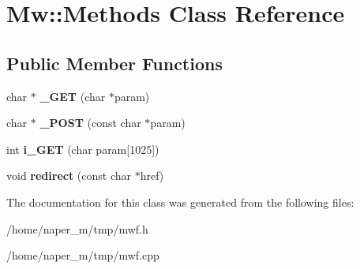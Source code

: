 \hypertarget{class_mw_1_1_methods}{\section{Mw\-:\-:Methods Class Reference}
\label{class_mw_1_1_methods}
}
\subsection*{Public Member Functions}
\begin{DoxyCompactItemize}
\item 
\hypertarget{class_mw_1_1_methods_ada65ad3c59fe222e7fce142459c24925}{char $\ast$ {\bfseries \-\_\-\-G\-E\-T} (char $\ast$param)}\label{class_mw_1_1_methods_ada65ad3c59fe222e7fce142459c24925}

\item 
\hypertarget{class_mw_1_1_methods_a9cb27954de74d75f45079f1bcd3cfc69}{char $\ast$ {\bfseries \-\_\-\-P\-O\-S\-T} (const char $\ast$param)}\label{class_mw_1_1_methods_a9cb27954de74d75f45079f1bcd3cfc69}

\item 
\hypertarget{class_mw_1_1_methods_aa3435e9b58d33433e47efe700c7fa77c}{int {\bfseries i\-\_\-\-G\-E\-T} (char param\mbox{[}1025\mbox{]})}\label{class_mw_1_1_methods_aa3435e9b58d33433e47efe700c7fa77c}

\item 
\hypertarget{class_mw_1_1_methods_a7628ff0b82ee7d7ac47a8877de7344a4}{void {\bfseries redirect} (const char $\ast$href)}\label{class_mw_1_1_methods_a7628ff0b82ee7d7ac47a8877de7344a4}

\end{DoxyCompactItemize}


The documentation for this class was generated from the following files\-:\begin{DoxyCompactItemize}
\item 
/home/naper\-\_\-m/tmp/mwf.\-h\item 
/home/naper\-\_\-m/tmp/mwf.\-cpp\end{DoxyCompactItemize}
